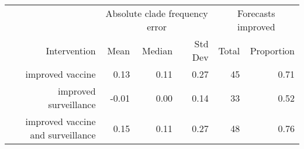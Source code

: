 
\begin{tabular*}{1.0\textwidth}{rrrrrr}
\toprule
             & \multicolumn{3}{c}{Absolute clade frequency error} & \multicolumn{2}{c}{Forecasts improved} \\
Intervention & Mean & Median & Std Dev & Total & Proportion \\
\midrule

improved vaccine & 0.13 & 0.11 & 0.27 & 45 & 0.71 \\
improved surveillance & -0.01 & 0.00 & 0.14 & 33 & 0.52 \\
improved vaccine and surveillance & 0.15 & 0.11 & 0.27 & 48 & 0.76 \\

\bottomrule
\end{tabular*}

